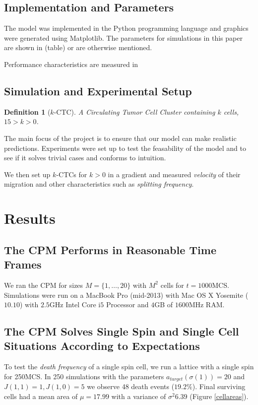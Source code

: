 \documentclass[12pt]{article}
\newtheorem{definition}{Definition}
\begin{document}
\subsection{Implementation and Parameters}
The model was implemented in the Python programming language and graphics were generated using Matplotlib\cite{matplotlib}. The parameters for simulations in this paper are shown in (table) or are otherwise mentioned. %

Performance characteristics are measured in 

\subsection{Simulation and Experimental Setup}
\begin{definition}[$k$-CTC]
A Circulating Tumor Cell Cluster containing $k$ cells, $15>k>0$.
\end{definition}

The main focus of the project is to ensure that our model can make realistic predictions. Experiments were set up to test the feasability of the model and to see if it solves trivial cases and conforms to intuition.

We then set up $k$-CTCs for $k>0$ in a gradient and measured \emph{velocity} of their migration and other characteristics such as \emph{splitting frequency}.

\section{Results}
\subsection{The CPM Performs in Reasonable Time Frames}
We ran the CPM for sizes $M=\{1, \ldots , 20\}$ with $M^2$ cells for $t=1000$MCS. Simulations were run on a MacBook Pro (mid-2013) with Mac OS X Yosemite ($10.10$) with $2.5$GHz Intel Core i$5$ Processor and $4$GB of $1600$MHz RAM.

\subsection{ The CPM Solves Single Spin and Single Cell Situations According to Expectations }
To test the \emph{death frequency} of a single spin cell, we run a lattice with a single spin for 250MCS. In 250 simulations with the parameters $a_{target}(\sigma(1))=20$ and $J(1,1)=1, J(1,0)=5$ we observe 48 death events ($19.2\%$). Final surviving cells had a mean area of $\mu = 17.99$ with a variance of $\sigma^2 6.39$ (Figure \ref{cellareas}). %
\end{document}
